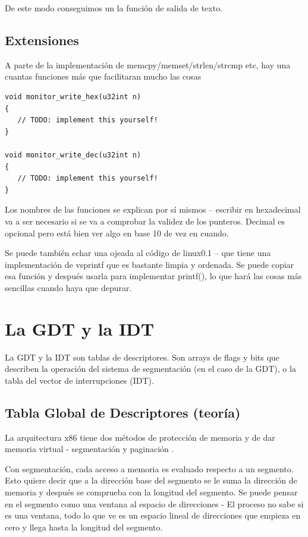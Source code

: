 \documentclass{report}
\begin{document}
De este modo conseguimos un la funci\'{o}n de salida de texto. 

\section{Extensiones}
A parte de la implementaci\'{o}n de memcpy/memset/strlen/strcmp etc, hay una cuantas funciones m\'{a}s que facilitaran mucho las cosas

\begin{lstlisting}
void monitor_write_hex(u32int n)
{
   // TODO: implement this yourself!
}

void monitor_write_dec(u32int n)
{
   // TODO: implement this yourself!
}
\end{lstlisting}

Los nombres de las funciones se explican por s\'{i} mismos – escribir en hexadecimal va a ser necesario si se va a comprobar la validez de los punteros. Decimal es opcional pero est\'{a} bien ver algo en base 10 de vez en cuando.

Se puede tambi\'{e}n echar una ojeada al c\'{o}digo de linux0.1 – que tiene una implementaci\'{o}n de vsprintf que es bastante limpia y ordenada. Se puede copiar esa funci\'{o}n y despu\'{e}s usarla para implementar printf(), lo que har\'{a} las cosas m\'{a}s sencillas cuando haya que depurar.

\chapter{La GDT y la IDT}

La GDT y la IDT son tablas de descriptores. Son arrays de flags y bits que describen la operaci\'{o}n del sistema de segmentaci\'{o}n (en el caso de la GDT), o la tabla del vector de interrupciones (IDT).


\section{Tabla Global de Descriptores (teor\'{i}a)}

La arquitectura x86 tiene dos m\'{e}todos de protecci\'{o}n de memoria y de dar memoria virtual - segmentaci\'{o}n y paginaci\'{o}n .

Con segmentaci\'{o}n, cada acceso a memoria es evaluado respecto a un segmento. Esto quiere decir que a la direcci\'{o}n base del segmento se le suma la direcci\'{o}n de memoria y despu\'{e}s se comprueba con la longitud del segmento. Se puede pensar en el segmento como una ventana al espacio de direcciones - El proceso no sabe si es una ventana, todo lo que ve es un espacio lineal de direcciones que empieza en cero y llega hasta la longitud del segmento.
\end{document}
